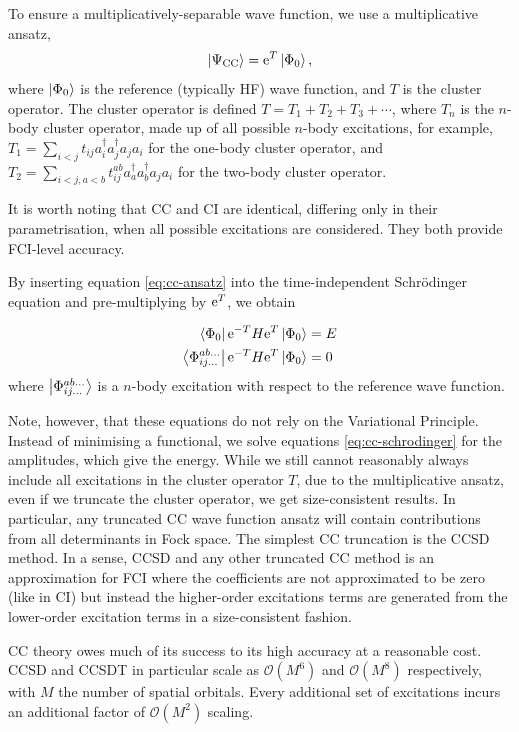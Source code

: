 To ensure a multiplicatively-separable wave function, we use a multiplicative ansatz,
\begin{equation}
    \label{eq:cc-ansatz}
\ket{\Psi_\mathrm{CC}} = \mathrm{e}^T\ket{\Phi_0},
\end{equation}
where $\ket{\Phi_0}$ is the reference (typically \gls{HF}) wave function, and $T$ is the cluster operator. The cluster operator is defined $T = T_1 + T_2 + T_3 + \cdots$, where $T_n$ is the $n$-body cluster operator, made up of all possible $n$-body excitations, for example, $T_1 = \sum_{i<j}t_{ij}a_i^\dag a_j^\dag a_j a_i$ for the one-body cluster operator, and $T_2 = \sum_{i<j,a<b}t_{ij}^{ab}a_a^\dag a_b^\dag a_j a_i$ for the two-body cluster operator.

It is worth noting that \gls{CC} and \gls{CI} are identical, differing only in their parametrisation, when all possible excitations are considered. They both provide \gls{FCI}-level accuracy.

By inserting equation \eqref{eq:cc-ansatz} into the time-independent Schr\"odinger equation and pre-multiplying by $\mathrm{e}^T$, we obtain

\begin{align}
    \label{eq:cc-schrodinger}
    \bra{\Phi_0}\mathrm{e}^{-T} H \mathrm{e}^T\ket{\Phi_0} &= E \\
    \bra{\Phi_{ij...}^{ab...}}\mathrm{e}^{-T} H \mathrm{e}^T\ket{\Phi_0} &= 0
\end{align}
where $\ket{\Phi_{ij...}^{ab...}}$ is a $n$-body excitation with respect to the reference wave function.

Note, however, that these equations do not rely on the Variational Principle. Instead of minimising a functional, we solve equations \eqref{eq:cc-schrodinger} for the amplitudes, which give the energy. While we still cannot reasonably always include all excitations in the cluster operator $T$, due to the multiplicative ansatz, even if we truncate the cluster operator, we get size-consistent results. In particular, any truncated CC wave function ansatz will contain contributions from all determinants in Fock space. The simplest CC truncation is the \gls{CCSD} method. In a sense, \gls{CCSD} and any other truncated CC method is an approximation for \gls{FCI} where the coefficients are not approximated to be zero (like in \gls{CI}) but instead the higher-order excitations terms are generated from the lower-order excitation terms in a size-consistent fashion.

CC theory owes much of its success to its high accuracy at a reasonable cost. \gls{CCSD} and \gls{CCSDT} in particular scale as $\mathcal{O}(M^6)$ and $\mathcal{O}(M^8)$ respectively, with $M$ the number of spatial orbitals. Every additional set of excitations incurs an additional factor of $\mathcal{O}(M^2)$ scaling.

